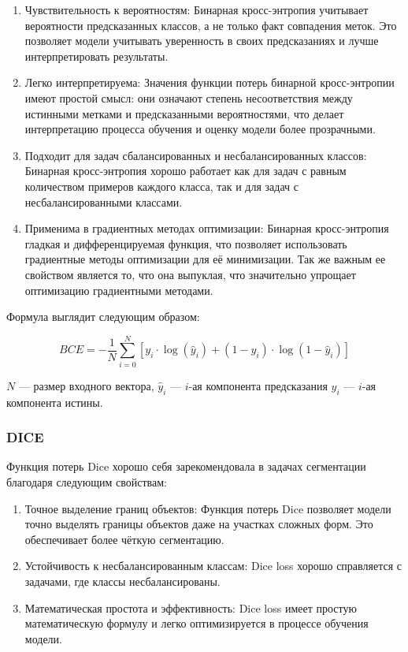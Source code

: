 \begin{enumerate}
	\item Чувствительность к вероятностям: Бинарная кросс-энтропия учитывает
	вероятности предсказанных классов, а не только факт совпадения меток. Это
	позволяет модели учитывать уверенность в своих предсказаниях и лучше
	интерпретировать результаты.

	\item Легко интерпретируема: Значения функции потерь бинарной
	кросс-энтропии имеют простой смысл: они означают степень несоответствия
	между истинными метками и предсказанными вероятностями, что делает
	интерпретацию процесса обучения и оценку модели более прозрачными.

	\item Подходит для задач сбалансированных и несбалансированных классов:
	Бинарная кросс-энтропия хорошо работает как для задач с равным количеством
	примеров каждого класса, так и для задач с несбалансированными классами.

	\item Применима в градиентных методах оптимизации: Бинарная кросс-энтропия
	гладкая и дифференцируемая функция, что позволяет использовать градиентные
	методы оптимизации для её минимизации. Так же важным ее свойством является
	то, что она выпуклая, что значительно упрощает оптимизацию градиентными
	методами.


\end{enumerate}

Формула выглядит следующим образом:

\begin{equation}
	BCE = - \frac{1}{N} \sum_{i=0}^{N} \left[ y_i \cdot \log(\hat{y}_i) + (1 - y_i)
		\cdot \log(1 - \hat{y}_i) \right]
	\label{eq:bce}
\end{equation}

\noindent $N$ --- размер входного вектора, $\hat{y}_i$ --- $i$-ая компонента предсказания
$y_i$ --- $i$-ая компонента истины.


\subsubsection{DICE}

Функция потерь Dice хорошо себя зарекомендовала в задачах сегментации благодаря
следующим свойствам:

\begin{enumerate}

	\item Точное выделение границ объектов: Функция потерь Dice позволяет
	модели точно выделять границы объектов даже на участках сложных форм. Это
	обеспечивает более чёткую сегментацию.

	\item Устойчивость к несбалансированным классам: Dice loss хорошо
	справляется с задачами, где классы несбалансированы.

	\item Математическая простота и эффективность: Dice loss имеет простую
	математическую формулу и легко оптимизируется в процессе обучения модели.

\end{enumerate}

